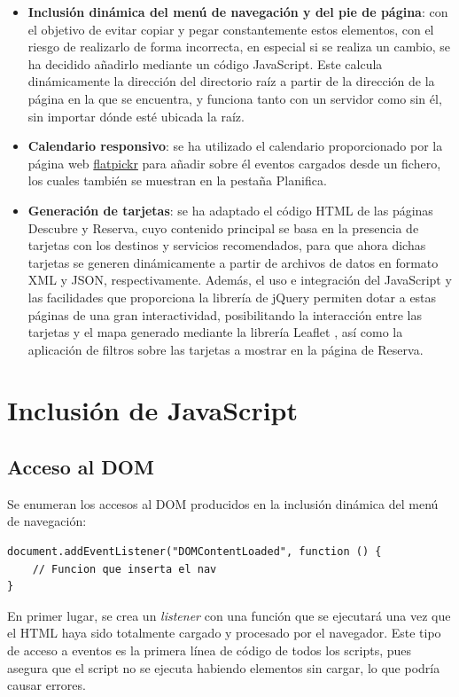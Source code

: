 \documentclass[11pt, a4paper]{book}
\begin{document}
	\begin{itemize}
		\item \textbf{Inclusión dinámica del menú de navegación y del pie de página}: con el objetivo de evitar copiar y pegar constantemente estos elementos, con el riesgo de realizarlo de forma incorrecta, en especial si se realiza un cambio, se ha decidido añadirlo mediante un código JavaScript. Este calcula dinámicamente la dirección del directorio raíz a partir de la dirección de la página en la que se encuentra, y funciona tanto con un servidor como sin él, sin importar dónde esté ubicada la raíz.
		\item \textbf{Calendario responsivo}: se ha utilizado el calendario proporcionado por la página web \href{https://flatpickr.js.org/}{flatpickr} para añadir sobre él eventos cargados desde un fichero, los cuales también se muestran en la pestaña Planifica.
        \item \textbf{Generación de tarjetas}: se ha adaptado el código HTML de las páginas Descubre y Reserva, cuyo contenido principal se basa en la presencia de tarjetas con los destinos y servicios recomendados, para que ahora dichas tarjetas se generen dinámicamente a partir de archivos de datos en formato XML y JSON, respectivamente. Además, el uso e integración del JavaScript y las facilidades que proporciona la librería de jQuery permiten dotar a estas páginas de una gran interactividad, posibilitando la interacción entre las tarjetas y el mapa generado mediante la librería Leaflet \cite{leaflet}, así como la aplicación de filtros sobre las tarjetas a mostrar en la página de Reserva.
	\end{itemize}
	
	\section{Inclusión de JavaScript}
    \subsection{Acceso al DOM}
	
	Se enumeran los accesos al DOM producidos en la inclusión dinámica del menú de navegación:
	
	\begin{lstlisting}
document.addEventListener("DOMContentLoaded", function () {
	// Funcion que inserta el nav
}
	\end{lstlisting}

	En primer lugar, se crea un \textit{listener} con una función que se ejecutará una vez que el HTML haya sido totalmente cargado y procesado por el navegador. Este tipo de acceso a eventos es la primera línea de código de todos los scripts, pues asegura que el script no se ejecuta habiendo elementos sin cargar, lo que podría causar errores.
	
\end{document}
